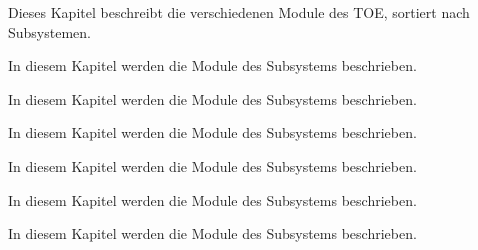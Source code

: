

Dieses Kapitel beschreibt die verschiedenen Module des TOE, sortiert
nach Subsystemen. 



In diesem Kapitel werden die Module des Subsystems  beschrieben.


\cleardoublepage{}



In diesem Kapitel werden die Module des Subsystems  beschrieben.




In diesem Kapitel werden die Module des Subsystems  beschrieben.


\cleardoublepage{}



In diesem Kapitel werden die Module des Subsystems  beschrieben.


\cleardoublepage{}



In diesem Kapitel werden die Module des Subsystems  beschrieben.


\cleardoublepage{}

\cleardoublepage{}



In diesem Kapitel werden die Module des Subsystems  beschrieben.


\cleardoublepage{}




